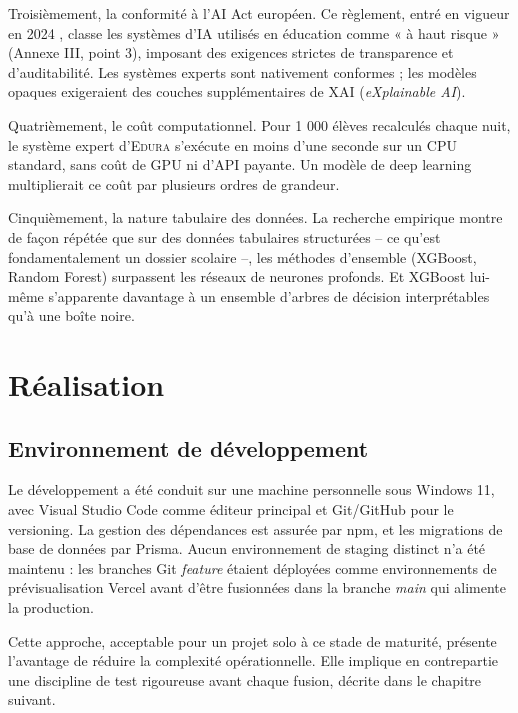 \documentclass[12pt,a4paper,oneside]{report}
\newcommand{\edura}{\textsc{Edura}}
\begin{document}
Troisièmement, la conformité à l'AI Act européen. Ce règlement, entré en vigueur en 2024 \autocite{euaiact2024}, classe les systèmes d'IA utilisés en éducation comme « à haut risque » (Annexe III, point 3), imposant des exigences strictes de transparence et d'auditabilité. Les systèmes experts sont nativement conformes ; les modèles opaques exigeraient des couches supplémentaires de XAI (\textit{eXplainable AI}).

Quatrièmement, le coût computationnel. Pour 1 000 élèves recalculés chaque nuit, le système expert d'\edura{} s'exécute en moins d'une seconde sur un CPU standard, sans coût de GPU ni d'API payante. Un modèle de deep learning multiplierait ce coût par plusieurs ordres de grandeur.

Cinquièmement, la nature tabulaire des données. La recherche empirique \autocite{mardolkar2021forecasting, chen2016xgboost} montre de façon répétée que sur des données tabulaires structurées -- ce qu'est fondamentalement un dossier scolaire --, les méthodes d'ensemble (XGBoost, Random Forest) surpassent les réseaux de neurones profonds. Et XGBoost lui-même s'apparente davantage à un ensemble d'arbres de décision interprétables qu'à une boîte noire.

\chapter{Réalisation}

\section{Environnement de développement}

Le développement a été conduit sur une machine personnelle sous Windows 11, avec Visual Studio Code comme éditeur principal et Git/GitHub pour le versioning. La gestion des dépendances est assurée par npm, et les migrations de base de données par Prisma. Aucun environnement de staging distinct n'a été maintenu : les branches Git \textit{feature} étaient déployées comme environnements de prévisualisation Vercel avant d'être fusionnées dans la branche \textit{main} qui alimente la production.

Cette approche, acceptable pour un projet solo à ce stade de maturité, présente l'avantage de réduire la complexité opérationnelle. Elle implique en contrepartie une discipline de test rigoureuse avant chaque fusion, décrite dans le chapitre suivant.
\end{document}

